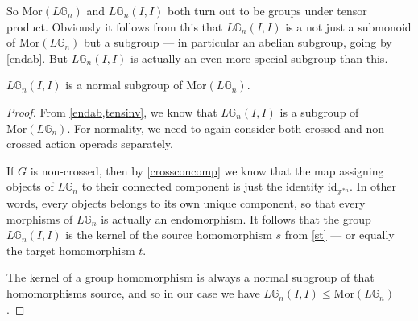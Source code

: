 So $\mathrm{Mor}(L\mathbb{G}_n)$ and $L\mathbb{G}_n(I,I)$ both turn out to be groups under tensor product. Obviously it follows from this that $L\mathbb{G}_n(I,I)$ is a not just a submonoid of $\mathrm{Mor}(L\mathbb{G}_n)$ but a subgroup --- in particular an abelian subgroup, going by \cref{endab}. But $L\mathbb{G}_n(I,I)$ is actually an even more special subgroup than this.

\begin{prop} $L\mathbb{G}_n(I,I)$ is a normal subgroup of $\mathrm{Mor}(L\mathbb{G}_n)$.
\end{prop}
\begin{proof}
From \cref{endab,tensinv}, we know that $L\mathbb{G}_n(I,I)$ is a subgroup of $\mathrm{Mor}(L\mathbb{G}_n)$. For normality, we need to again consider both crossed and non-crossed action operads separately. 

If $G$ is non-crossed, then by \cref{crossconcomp} we know that the map assigning objects of $L\mathbb{G}_n$ to their connected component is just the identity $\mathrm{id}_{\mathbb{Z}^{\ast n}}$. In other words, every objects belongs to its own unique component, so that every morphisms of $L\mathbb{G}_n$ is actually an endomorphism. It follows that the group $L\mathbb{G}_n(I,I)$ is the kernel of the source homomorphism $s$ from \cref{st} --- or equally the target homomorphism $t$.
\begin{eq*}  \end{eq*}
The kernel of a group homomorphism is always a normal subgroup of that homomorphisms source, and so in our case we have $L\mathbb{G}_n(I,I) \le \mathrm{Mor}(L\mathbb{G}_n)$.


\end{proof}
